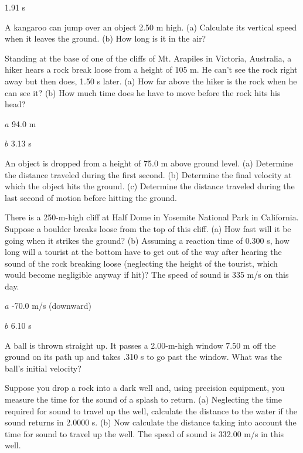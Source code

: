 \documentclass[
]{book}
\begin{document}
\leavevmode{}%
1.91 s

\hypertarget{fs-id4076783}{}
\leavevmode{}%
A kangaroo can jump over an object 2.50 m high. (a) Calculate its
vertical speed when it leaves the ground. (b) How long is it in the air?

\hypertarget{fs-id4073110}{}
\leavevmode{}%
Standing at the base of one of the cliffs of Mt. Arapiles in Victoria,
Australia, a hiker hears a rock break loose from a height of 105 m. He
can't see the rock right away but then does, 1.50 s later. (a) How far
above the hiker is the rock when he can see it? (b) How much time does
he have to move before the rock hits his head?

\leavevmode{}%
\(a\) 94.0 m

\(b\) 3.13 s

\hypertarget{fs-id776278}{}
\leavevmode{}%
An object is dropped from a height of 75.0 m above ground level. (a)
Determine the distance traveled during the first second. (b) Determine
the final velocity at which the object hits the ground. (c) Determine
the distance traveled during the last second of motion before hitting
the ground.

\hypertarget{fs-id1798285}{}
\leavevmode{}%
There is a 250-m-high cliff at Half Dome in Yosemite National Park in
California. Suppose a boulder breaks loose from the top of this cliff.
(a) How fast will it be going when it strikes the ground? (b) Assuming a
reaction time of 0.300 s, how long will a tourist at the bottom have to
get out of the way after hearing the sound of the rock breaking loose
(neglecting the height of the tourist, which would become negligible
anyway if hit)? The speed of sound is 335 m/s on this day.

\leavevmode{}%
\(a\) -70.0 m/s (downward)

\(b\) 6.10 s

\hypertarget{fs-id4044798}{}
\leavevmode{}%
A ball is thrown straight up. It passes a 2.00-m-high window 7.50 m off
the ground on its path up and takes .310 s to go past the window. What
was the ball's initial velocity?

\hypertarget{fs-id4048528}{}
\leavevmode{}%
Suppose you drop a rock into a dark well and, using precision equipment,
you measure the time for the sound of a splash to return. (a) Neglecting
the time required for sound to travel up the well, calculate the
distance to the water if the sound returns in 2.0000 s. (b) Now
calculate the distance taking into account the time for sound to travel
up the well. The speed of sound is 332.00 m/s in this well.
\end{document}
